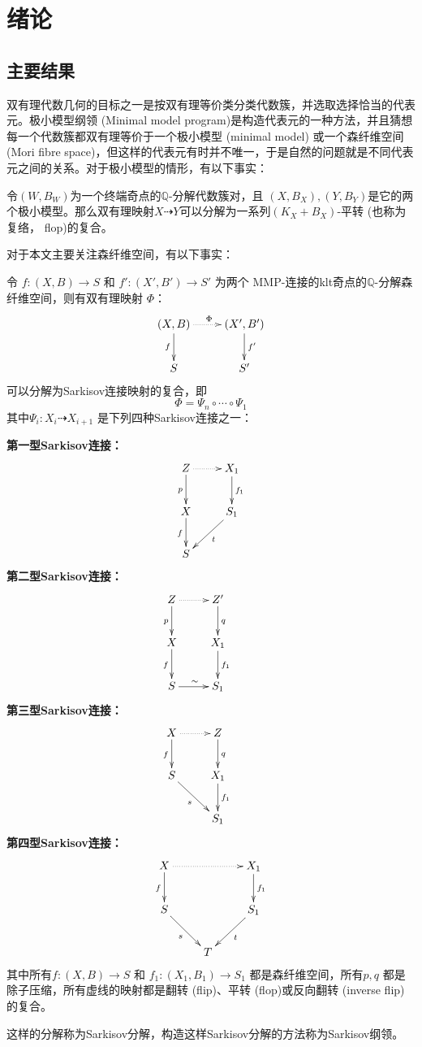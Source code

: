 \chapter{绪论}
\section{主要结果}
双有理代数几何的目标之一是按双有理等价类分类代数簇，并选取选择恰当的代表元。极小模型纲领 (Minimal model program)是构造代表元的一种方法，并且猜想每一个代数簇都双有理等价于一个极小模型 (minimal model) 或一个森纤维空间 (Mori fibre space)，但这样的代表元有时并不唯一，于是自然的问题就是不同代表元之间的关系。对于极小模型的情形，有以下事实：
\begin{theorem}[平转连接极小模型]\cite[Theorem 1]{flopmin}
  令$(W,B_{W})$为一个终端奇点的$\mathbb{Q}$-分解代数簇对，且 $(X,B_{X}), (Y,B_{Y})$是它的两个极小模型。那么双有理映射$X \dashrightarrow Y$可以分解为一系列$(K_{X}+B_{X})$-平转 (也称为复络， flop)的复合。
\end{theorem}

对于本文主要关注森纤维空间，有以下事实：
\begin{theorem}[Sarkisov分解]\label{main}
  令 $ f:(X, B)\to S$ 和 $f':(X', B')\to S' $ 为两个 MMP-连接的klt奇点的$ \mathbb{Q} $-分解森纤维空间，则有双有理映射 $\Phi$：
  \[ \xymatrix{
      (X,B)\ar[d]_{f}\ar@{.>}[r]^\Phi & (X',B')\ar[d]^{f'}\\
      S & S'} \]
  可以分解为Sarkisov连接映射的复合，即
  \[ \Phi=\Psi_{n}\circ \cdots \circ \Psi_{1} \]
  其中$\Psi_{i}:X_{i}\dashrightarrow X_{i+1} $ 是下列四种Sarkisov连接之一：

  \textbf{第一型Sarkisov连接：}
  \[\xymatrix{
      Z\ar[d]_{p}\ar@{.>}[r]&X_{1}\ar[d]^{f_1}\\
      X\ar[d]_{f}&S_1\ar[dl]^{t}\\
  S &}\]
  \textbf{第二型Sarkisov连接：}
  \[\xymatrix{
      Z\ar[d]_{p}\ar@{.>}[r]&Z'\ar[d]^{q}&\\
      X\ar[d]_{f}&X_1\ar[d]^{f_1}\\
  S\ar[r]^{\sim}&S_1}\]
  \textbf{第三型Sarkisov连接：}
\[ \xymatrix{
    X\ar@{.>}[r]\ar[d]_{f}& Z\ar[d]^q& \\
    S\ar[rd]_{s}         & X_{1}\ar[d]^{f_{1}}&\\
    &S_{1}
    } \]
  \textbf{第四型Sarkisov连接：}
\[ \xymatrix{
      X \ar[d]_f\ar@{.>}[rr]&&X_{1}\ar[d]^{f_1}\\
      S \ar[dr]_{s}&&S_{1} \ar[dl]^{t}\\
      &T &} \]
  其中所有$ f:(X, B)\to S $ 和 $ f_1:(X_1, B_1)\to S_1 $ 都是森纤维空间，所有$p,q$ 都是除子压缩，所有虚线的映射都是翻转 (flip)、平转 (flop)或反向翻转 (inverse flip)的复合。
\end{theorem}
这样的分解称为Sarkisov分解，构造这样Sarkisov分解的方法称为Sarkisov纲领。

